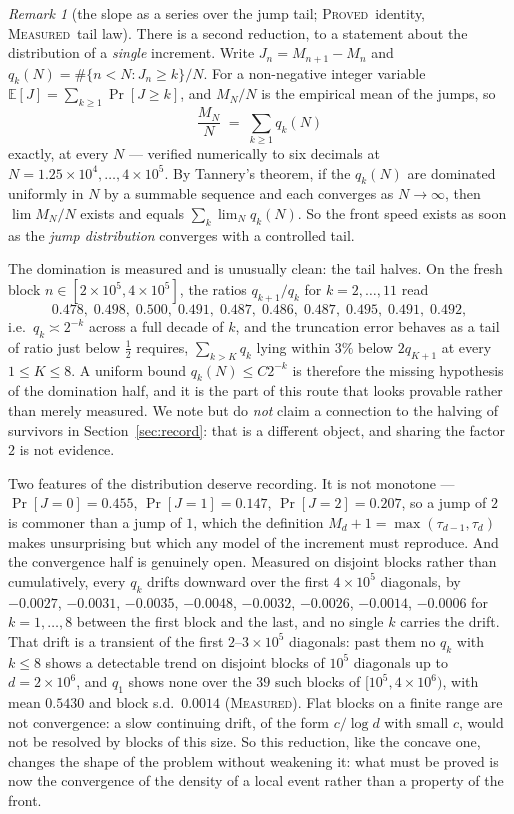 \documentclass[11pt]{article}
\theoremstyle{definition}
\theoremstyle{remark}
\newtheorem{remark}[theorem]{Remark}
\newcommand{\PROVED}{\textsc{Proved}}
\newcommand{\MEASURED}{\textsc{Measured}}
\begin{document}
\begin{remark}[the slope as a series over the jump tail; \PROVED\ identity, \MEASURED\ tail law]\label{fr:jumpseries}
There is a second reduction, to a statement about the distribution of a \emph{single} increment. Write
$J_n=M_{n+1}-M_n$ and $q_k(N)=\#\{n<N:J_n\ge k\}/N$. For a non-negative integer variable
$\mathbb E[J]=\sum_{k\ge1}\Pr[J\ge k]$, and $M_N/N$ is the empirical mean of the jumps, so
\[
\frac{M_N}{N}\;=\;\sum_{k\ge1}q_k(N)
\]
exactly, at every $N$ --- verified numerically to six decimals at
$N=1.25\times10^{4},\dots,4\times10^{5}$. By Tannery's theorem, if the $q_k(N)$ are dominated uniformly
in $N$ by a summable sequence and each converges as $N\to\infty$, then $\lim M_N/N$ exists and equals
$\sum_k\lim_Nq_k(N)$. So the front speed exists as soon as the \emph{jump distribution} converges with a
controlled tail.

The domination is measured and is unusually clean: the tail halves. On the fresh block
$n\in[2\times10^{5},4\times10^{5}]$, the ratios $q_{k+1}/q_k$ for $k=2,\dots,11$ read
\[
0.478,\;0.498,\;0.500,\;0.491,\;0.487,\;0.486,\;0.487,\;0.495,\;0.491,\;0.492,
\]
i.e.\ $q_k\asymp2^{-k}$ across a full decade of $k$, and the truncation error behaves as a tail of
ratio just below $\tfrac12$ requires, $\sum_{k>K}q_k$ lying within $3\%$ below $2q_{K+1}$ at every $1\le K\le8$. A uniform
bound $q_k(N)\le C2^{-k}$ is therefore the missing hypothesis of the domination half, and it is the
part of this route that looks provable rather than merely measured. We note but do \emph{not} claim a
connection to the halving of survivors in Section~\ref{sec:record}: that is a different object, and
sharing the factor $2$ is not evidence.

Two features of the distribution deserve recording. It is not monotone --- $\Pr[J=0]=0.455$,
$\Pr[J=1]=0.147$, $\Pr[J=2]=0.207$, so a jump of $2$ is commoner than a jump of $1$, which the
definition $M_d+1=\max(\tau_{d-1},\tau_d)$ makes unsurprising but which any model of the increment must
reproduce. And the convergence half is genuinely open. Measured on disjoint blocks rather than
cumulatively, every $q_k$ drifts downward over the first $4\times10^{5}$ diagonals, by $-0.0027$, $-0.0031$, $-0.0035$, $-0.0048$, $-0.0032$,
$-0.0026$, $-0.0014$, $-0.0006$ for $k=1,\dots,8$ between the first block and the last, and no single $k$ carries
the drift. That drift is a transient of the first $2$--$3\times10^{5}$ diagonals: past them no $q_k$ with
$k\le8$ shows a detectable trend on disjoint blocks of $10^{5}$ diagonals up to $d=2\times10^{6}$, and $q_1$ shows none over
the $39$ such blocks of $[10^{5},4\times10^{6})$, with mean $0.5430$ and block s.d.\ $0.0014$ (\MEASURED).
Flat blocks on a finite range are not convergence: a slow continuing drift, of the form $c/\log d$ with
small $c$, would not be resolved by blocks of this size. So this reduction, like the concave one, changes the shape
of the problem without weakening it: what must be proved is now the convergence of the density of a
local event rather than a property of the front.


\end{remark}
\end{document}
